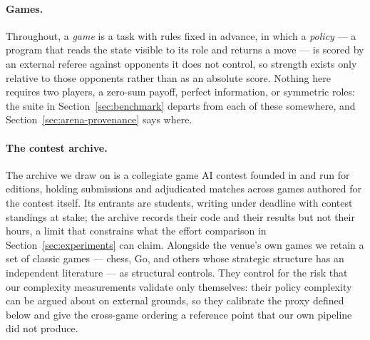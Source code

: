 \paragraph{Games.}
Throughout, a \emph{game} is a task with rules fixed in advance, in which a
\emph{policy} --- a program that reads the state visible to its role and returns a move
--- is scored by an external referee against opponents it does not control, so strength
exists only relative to those opponents rather than as an absolute score. Nothing here
requires two players, a zero-sum payoff, perfect information, or symmetric roles: the
suite in Section~\ref{sec:benchmark} departs from each of these somewhere, and
Section~\ref{sec:arena-provenance} says where.

\paragraph{The contest archive.}
The archive we draw on is a collegiate game AI contest founded in
 and run for  editions, holding 
submissions and  adjudicated matches across  games
authored for the contest itself. Its entrants are students, writing under
deadline with contest standings at stake; the archive records their code and
their results but not their hours, a limit that constrains what the effort
comparison in Section~\ref{sec:experiments} can claim. Alongside the venue's own
games we retain a set of classic games --- chess, Go, and others whose strategic
structure has an independent literature --- as structural controls. They control
for the risk that our complexity measurements validate only themselves: their
policy complexity can be argued about on external grounds, so they calibrate the
proxy defined below and give the cross-game ordering a reference point that our
own pipeline did not produce.

